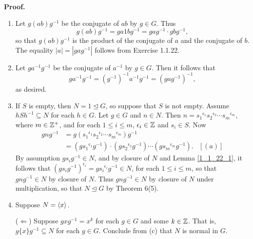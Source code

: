 \begin{enumerate}
      \textbf{Proof.}

      \begin{enumerate}
         \item Let $g(ab)g^{-1}$ be the conjugate of $ab$ by $g \in G$. Thus
               $$g(ab)g^{-1} = ga1bg^{-1} = gag^{-1} \cdot gbg^{-1},$$
               so that $g(ab)g^{-1}$ is the product of the conjugate of $a$ and
               the conjugate of $b$. The equality $|a| = |gag^{-1}|$ follows
               from Exercise 1.1.22.
         \item Let $ga^{-1}g^{-1}$ be the conjugate of $a^{-1}$ by $g \in G$. 
               Then it follows that
               $$ga^{-1}g^{-1} = (g^{-1})^{-1}a^{-1}g^{-1} = (gag^{-1})^{-1},$$
               as desired.
         \item If $S$ is empty, then $N = 1 \trianglelefteq G$, so suppose that
               $S$ is not empty. Assume $hSh^{-1} \subseteq N$ for each
               $h \in G$. Let $g \in G$ and $n \in N$. Then
               $n = {s_1}^{\epsilon_1}{s_2}^{\epsilon_2} \cdots
                {s_m}^{\epsilon_m}$, where $m \in \mathbb{Z}^+$, and for each
               $1 \le i \le m$, $\epsilon_i \in \mathbb{Z}$ and $s_i \in S$. Now
               \begin{align*}
                  gng^{-1} &= g({s_1}^{\epsilon_1}{s_2}^{\epsilon_2} \cdots
                     {s_m}^{\epsilon_m})g^{-1} \\
                     &= (g{s_1}^{\epsilon_1}g^{-1})\cdot
                        (g{s_2}^{\epsilon_2}g^{-1}) 
                        \cdots (g{s_m}^{\epsilon_m}g^{-1}). &[(a)]
               \end{align*}
               By assumption $g{s_i}g^{-1} \in N$, and by closure of $N$ and 
               Lemma \ref{1_1_22_1}, it follows that
               $(g{s_i}g^{-1})^{\epsilon_i} = g{s_i}^{\epsilon_i}g^{-1} \in N$,
               for each $1 \le i \le m$, so that $gng^{-1} \in N$ by closure of 
               $N$. Thus $gng^{-1} \in N$ by closure of $N$ under 
               multiplication, so that $N \trianglelefteq G$ by Theorem 6(5).
         \item Suppose $N = \langle x \rangle$.

               ($\Leftarrow$) Suppose $gxg^{-1} = x^k$ for each $g \in G$ and
               some $k \in \mathbb{Z}$. That is, $g\{x\}g^{-1} \subseteq N$ for each
               $g \in G$. Conclude from (c) that $N$ is normal in $G$.


\end{enumerate}
\end{enumerate}
